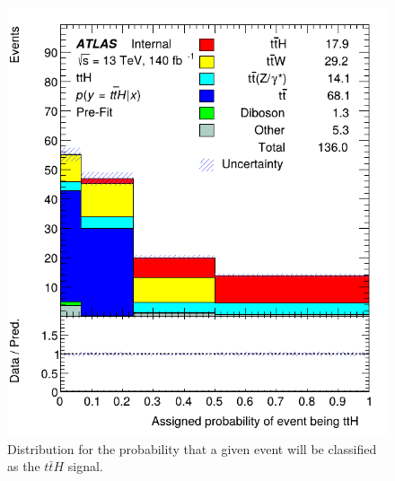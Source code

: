 \begin{figure}[ht]
    \centering
    
    \includegraphics[scale=0.4]{res/AnalysisPlots/probs-ttH.png}


    \caption{Distribution for the probability that a given event will be classified as the $t\bar{t}H$ signal.}
    \label{probsttH}
\end{figure}